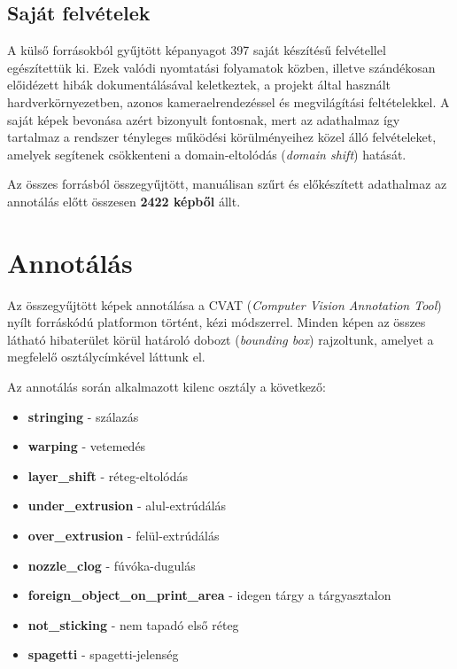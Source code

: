    \subsection{Saját felvételek}

    A külső forrásokból gyűjtött képanyagot 397 saját készítésű felvétellel egészítettük ki.
    Ezek valódi nyomtatási folyamatok közben, illetve szándékosan előidézett hibák dokumentálásával
    keletkeztek, a projekt által használt hardverkörnyezetben, azonos kameraelrendezéssel és
    megvilágítási feltételekkel. A saját képek bevonása azért bizonyult fontosnak, mert az
    adathalmaz így tartalmaz a rendszer tényleges működési körülményeihez közel álló felvételeket,
    amelyek segítenek csökkenteni a domain-eltolódás (\textit{domain shift}) hatását.

    Az összes forrásból összegyűjtött, manuálisan szűrt és előkészített adathalmaz az annotálás
    előtt összesen \textbf{2422 képből} állt.

\section{Annotálás}

    Az összegyűjtött képek annotálása a CVAT (\textit{Computer Vision Annotation Tool})~\cite{cvat}
    nyílt forráskódú platformon történt, kézi módszerrel. Minden képen az összes látható hibaterület
    körül határoló dobozt (\textit{bounding box}) rajzoltunk, amelyet a megfelelő osztálycímkével
    láttunk el.

    Az annotálás során alkalmazott kilenc osztály a következő:

    \begin{itemize}
        \item \textbf{stringing} - szálazás
        \item \textbf{warping} - vetemedés
        \item \textbf{layer\_shift} - réteg-eltolódás
        \item \textbf{under\_extrusion} - alul-extrúdálás
        \item \textbf{over\_extrusion} - felül-extrúdálás
        \item \textbf{nozzle\_clog} - fúvóka-dugulás
        \item \textbf{foreign\_object\_on\_print\_area} - idegen tárgy a tárgyasztalon
        \item \textbf{not\_sticking} - nem tapadó első réteg
        \item \textbf{spagetti} - spagetti-jelenség
    \end{itemize}

